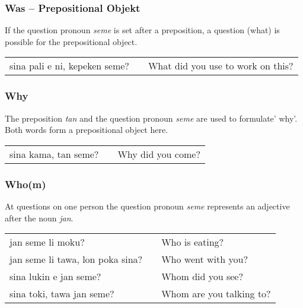 \subsubsection*{Was -- Prepositional Objekt}
%
If the question pronoun \textit{seme} is set after a preposition, a question (what) is possible for the prepositional object.

\begin{supertabular}{p{5,5cm}|ll}
sina pali e ni, kepeken seme? &&  What did you use to work on this? \\
\end{supertabular} 
%
{}
\subsubsection*{Why}
%
The preposition \textit{tan} and the question pronoun \textit{seme} are used to formulate' why'. 
Both words form a prepositional object here.

\begin{supertabular}{p{5,5cm}|ll}
sina kama, tan seme? && Why did you come? \\
\end{supertabular} 
%
\subsubsection*{Who(m)}
%
At questions on one person the question pronoun \textit{seme} represents an adjective after the noun \textit{jan}. 

\begin{supertabular}{p{5,5cm}|ll}
jan seme li moku? && Who is eating? \\
jan seme li tawa, lon poka sina? && Who went with you? \\
sina lukin e jan seme? && Whom did you see? \\
sina toki, tawa jan seme? && Whom are you talking to? \\
\end{supertabular} 
%
